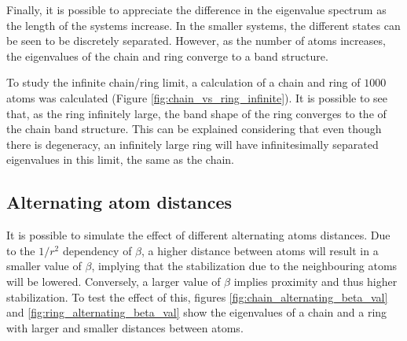 \documentclass[twocolumn]{article}
\begin{document}
Finally, it is possible to appreciate the difference in the eigenvalue spectrum as the length of the systems increase. In the smaller systems, the different states can be seen to be discretely separated. However, as the number of atoms increases, the eigenvalues of the chain and ring converge to a band structure. 

To study the infinite chain/ring limit, a calculation of a chain and ring of $1000$ atoms was calculated (Figure \ref{fig:chain_vs_ring_infinite}). It is possible to see that, as the ring infinitely large, the band shape of the ring converges to the of the chain band structure. This can be explained considering that even though there is degeneracy, an infinitely large ring will have infinitesimally separated eigenvalues in this limit, the same as the chain. 

\subsection{Alternating atom distances}
It is possible to simulate the effect of different alternating atoms distances. Due to the $1/r^2$ dependency of $\beta$, a higher distance between atoms will result in a smaller value of $\beta$, implying that the stabilization due to the neighbouring atoms will be lowered. Conversely, a larger value of $\beta$ implies proximity and thus higher stabilization. To test the effect of this, figures \ref{fig:chain_alternating_beta_val} and \ref{fig:ring_alternating_beta_val} show the eigenvalues of a chain and a ring with larger and smaller distances between atoms.
\end{document}
